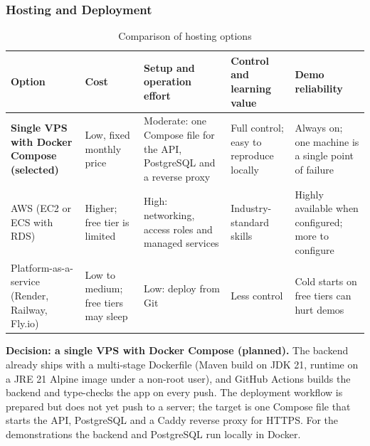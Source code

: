 
\subsubsection{Hosting and Deployment}

\begingroup

\footnotesize

\begin{longtable}{|>{\raggedright\arraybackslash}p{2.6cm}|>{\raggedright\arraybackslash}p{2.95cm}|>{\raggedright\arraybackslash}p{2.95cm}|>{\raggedright\arraybackslash}p{2.95cm}|>{\raggedright\arraybackslash}p{2.95cm}|}

\caption{Comparison of hosting options}\label{tab:tech-hosting}\\

\hline

\textbf{Option} & \textbf{Cost} & \textbf{Setup and operation effort} & \textbf{Control and learning value} & \textbf{Demo reliability} \\ \hline

\textbf{Single VPS with Docker Compose (selected)} & Low, fixed monthly price &

Moderate: one Compose file for the API, PostgreSQL and a reverse proxy &

Full control; easy to reproduce locally &

Always on; one machine is a single point of failure \\ \hline

AWS (EC2 or ECS with RDS) & Higher; free tier is limited &

High: networking, access roles and managed services &

Industry-standard skills &

Highly available when configured; more to configure \\ \hline

Platform-as-a-service (Render, Railway, Fly.io) & Low to medium; free tiers may sleep &

Low: deploy from Git &

Less control &

Cold starts on free tiers can hurt demos \\ \hline

\end{longtable}

\endgroup

\noindent\textbf{Decision: a single VPS with Docker Compose (planned).} The
backend already ships with a multi-stage Dockerfile (Maven build on JDK 21,
runtime on a JRE 21 Alpine image under a non-root user), and GitHub Actions
builds the backend and type-checks the app on every push. The deployment
workflow is prepared but does not yet push to a server; the target is one
Compose file that starts the API, PostgreSQL and a Caddy reverse proxy for
HTTPS. For the demonstrations the backend and PostgreSQL run locally in
Docker.


